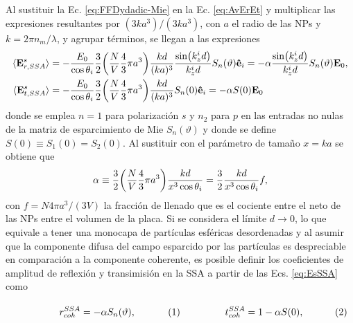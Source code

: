Al sustituir la Ec. \eqref{eq:FFDydadic-Mie} en la Ec. \eqref{eq:AvErEt} y multiplicar las expresiones resultantes por $(3ka^3)/(3ka^3)$, con $a$ el radio de las NPs y $k = 2\pi n_m /\lambda$, y agrupar términos, se llegan a las expresiones 
	\begin{subequations}\begin{align}
		\langle \vb{E}^s_{r,SSA}\rangle & = - \frac{E_0}{\cos\theta_i} \frac32  \qty(\frac{N}{V} \frac43\pi a^3)\frac{kd}{(ka)^3}   \frac{\sin(k_z^id)}{k_z^i d}  S_n(\vartheta)\vu{e}_i =
		-\alpha  \frac{\sin(k_z^id)}{k_z^i d}   S_n(\vartheta) \vb{E}_0,
		\label{eqs:EsSSAr}\\
	\langle \vb{E}^s_{t,SSA}\rangle &=  - \frac{E_0}{\cos\theta_i} \frac32
						 \qty(\frac{N}{V}\frac43\pi a^3  ) \frac{kd}{(ka)^3}  S_n(0) \vu{e}_i  
						 = - \alpha S(0) \vb{E}_0
		\label{eqs:EsSSAt}
	\end{align}\label{eq:EsSSA}\end{subequations}
donde  se emplea $n=1$ para polarización $s$ y $n_2$ para $p$ en las entradas no nulas de la matriz de esparcimiento de Mie $S_n(\vartheta)$ y donde se define $S(0) \equiv S_1(0)=S_2(0)$. Al sustituir con el parámetro de tamaño $x=ka$ se obtiene que  
\begin{align*}
	\alpha \equiv \frac32 \qty(\frac{N}{V}\frac43 \pi a^3  )\frac{kd}{x^3\cos\theta_i} = \frac32\frac{kd}{ x^3\cos\theta_i} f,
	\end{align*}
con $f= N 4\pi a^3/(3V)$ la fracción de llenado que es el cociente entre el neto de las NPs entre el volumen de la placa. Si se considera el límite $d\to 0$, lo que equivale a tener una monocapa de partículas esféricas desordenadas y al asumir que la componente difusa del campo esparcido por las partículas es despreciable en comparación a la componente coherente, es posible definir los coeficientes de amplitud de reflexión y transimisión en la SSA a partir de las Ecs. \eqref{eq:EsSSA} como \vspace*{-.75em}	
	
	\begin{subequations}\eqhalf{r_{coh}^{SSA} = -\alpha S_n(\vartheta),}
	\eqhalf{t_{coh}^{SSA} = 1 - \alpha S(0), }
	\label{eqs:rtcohSSA}\end{subequations}\vspace*{-.75em}	
	
